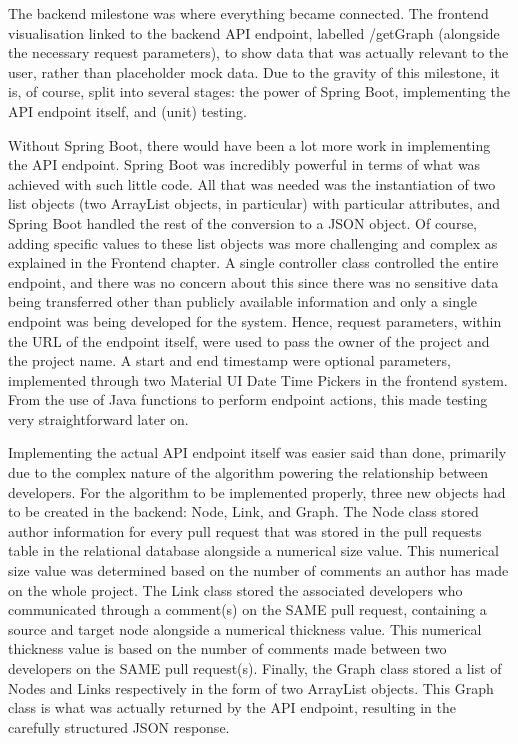 The backend milestone was where everything became connected.
The frontend visualisation linked to the backend API endpoint, labelled /getGraph (alongside the necessary request parameters),
to show data that was actually relevant to the user,
rather than placeholder mock data.
Due to the gravity of this milestone, it is, of course, split into several stages:
the power of Spring Boot, implementing the API endpoint itself, and (unit) testing.

Without Spring Boot, there would have been a lot more work in implementing the API endpoint.
Spring Boot was incredibly powerful in terms of what was achieved with such little code.
All that was needed was the instantiation of two list objects
(two ArrayList objects, in particular) with particular attributes,
and Spring Boot handled the rest of the conversion to a JSON object.
Of course,
adding specific values to these list objects was more challenging and complex as explained in the Frontend chapter.
A single controller class controlled the entire endpoint,
and there was no concern about this
since there was no sensitive data being transferred other than publicly available information and only a single endpoint was being developed for the system.
Hence, request parameters, within the URL of the endpoint itself, were used to pass the owner of the project and the project name.
A start and end timestamp were optional parameters, implemented through two Material UI Date Time Pickers in the frontend system.
From the use of Java functions to perform endpoint actions, this made testing very straightforward later on.

Implementing the actual API endpoint itself was easier said than done, primarily due to the complex nature of the algorithm powering the relationship between developers.
For the algorithm to be implemented properly, three new objects had to be created in the backend: Node, Link, and Graph.
The Node class stored author information for every pull request that was stored in the pull requests table in the relational database alongside a numerical size value.
This numerical size value was determined based on the number of comments an author has made on the whole project.
The Link class stored the associated developers who communicated through a comment(s) on the SAME pull request, containing a source and target node alongside a numerical thickness value.
This numerical thickness value is based on the number of comments made between two developers on the SAME pull request(s).
Finally, the Graph class stored a list of Nodes and Links respectively in the form of two ArrayList objects.
This Graph class is what was actually returned by the API endpoint, resulting in the carefully structured JSON response.

